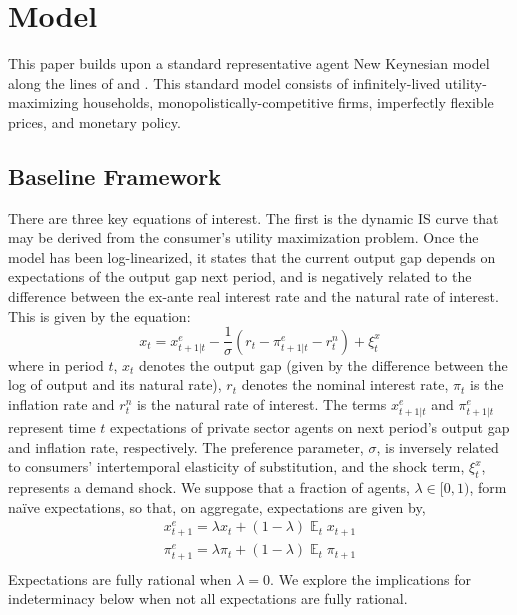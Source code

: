 \documentclass[english,authoryear,12pt]{elsarticle}
\DeclareMathOperator{\E}{\mathbb{E}}
\begin{document}
\section{\label{Model}Model}
This paper builds upon a standard representative agent New Keynesian model along the lines of \cite{clarida1999} and \cite{steinsson2003}. This standard model consists of infinitely-lived utility-maximizing households, monopolistically-competitive firms, imperfectly flexible prices, and monetary policy.

\subsection{Baseline Framework}
There are three key equations of interest. The first is the dynamic IS curve that may be derived from the consumer's utility maximization problem. Once the model has been log-linearized, it states that the current output gap depends on expectations of the output gap next period, and is negatively related to the difference between the ex-ante real interest rate and the natural rate of interest. This is given by the equation:
\begin{equation}\label{eq:ISe}
	x_t = x_{t+1|t}^e - \frac{1}{\sigma} \left( r_t - \pi_{t+1|t}^e -r^n_t \right) + \xi_t^{x}
\end{equation}
where in period $t$, $x_t$ denotes the output gap (given by the difference between the log of output and its natural rate), $r_t$ denotes the nominal interest rate, $\pi_t$ is the inflation rate and $r^n_t$ is the natural rate of interest. The terms $x_{t+1|t}^e$ and $\pi_{t+1|t}^e$ represent time $t$ expectations of private sector agents on next period's output gap and inflation rate, respectively. The preference parameter, $\sigma$, is inversely related to consumers' intertemporal elasticity of substitution, and the shock term, $\xi_t^x$, represents a demand shock. We suppose that a fraction of agents, $\lambda\in[0,1)$, form na\"ive expectations, so that, on aggregate, expectations are given by,
\begin{equation}
	\begin{array}{c}
		x_{t+1}^e = \lambda x_t + (1-\lambda) \E_t x_{t+1} \\ [1.5pc]
		\pi_{t+1}^e = \lambda \pi_t + (1-\lambda) \E_t \pi_{t+1} \\ [1.5pc]
	\end{array}
\end{equation}
Expectations are fully rational when $\lambda=0$. We explore the implications for indeterminacy below when not all expectations are fully rational.
\end{document}
